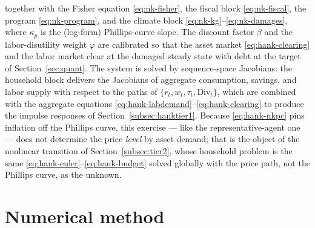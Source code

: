 \documentclass[12pt]{article}
\newcommand{\vphi}{\varphi}
\begin{document}
together with the Fisher equation \eqref{eq:nk-fisher}, the fiscal block
\eqref{eq:nk-fiscal}, the program \eqref{eq:nk-program}, and the climate
block \eqref{eq:nk-kg}--\eqref{eq:nk-damages}, where $\kappa_p$ is the
(log-form) Phillips-curve slope. The discount factor $\beta$ and the
labor-disutility weight $\vphi$ are calibrated so that the asset market
\eqref{eq:hank-clearing} and the labor market clear at the damaged steady
state with debt at the target of Section~\ref{sec:quant}. The system is
solved by sequence-space Jacobians: the household block delivers the
Jacobians of aggregate consumption, savings, and labor supply with respect
to the paths of $\{r_t,w_t,\tau_t,\mathrm{Div}_t\}$, which are combined with
the aggregate equations \eqref{eq:hank-labdemand}--\eqref{eq:hank-clearing}
to produce the impulse responses of
Section~\ref{subsec:hanktier1}. Because \eqref{eq:hank-nkpc} pins inflation
off the Phillips curve, this exercise --- like the representative-agent one
--- does not determine the price \emph{level} by asset demand; that is the
object of the nonlinear transition of Section~\ref{subsec:tier2}, whose
household problem is the same \eqref{eq:hank-euler}--\eqref{eq:hank-budget}
solved globally with the price path, not the Phillips curve, as the unknown.

\section{Numerical method}\label{app:numerics}
\end{document}
